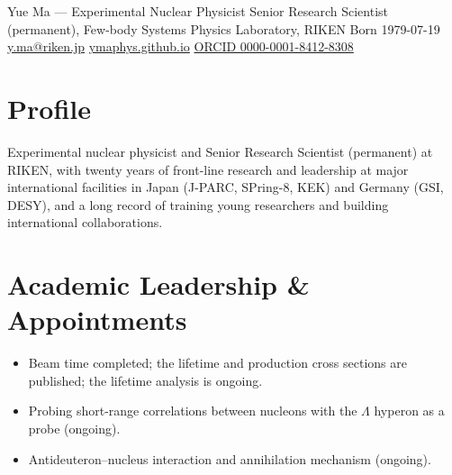 \documentclass[a4paper,11pt,fontset=none]{ctexart}
\begin{document}
  {Yue Ma --- Experimental Nuclear Physicist}
  {Senior Research Scientist (permanent), Few-body Systems Physics Laboratory, RIKEN \quad\textbar\quad Born 1979-07-19 \quad\textbar\quad \href{mailto:y.ma@riken.jp}{y.ma@riken.jp} \quad\textbar\quad \href{https://ymaphys.github.io}{ymaphys.github.io} \quad\textbar\quad \href{https://orcid.org/0000-0001-8412-8308}{ORCID 0000-0001-8412-8308}}

\section{Profile}

Experimental nuclear physicist and Senior Research Scientist (permanent) at RIKEN, with twenty years of front-line research and leadership at major international facilities in Japan (J-PARC, SPring-8, KEK) and Germany (GSI, DESY), and a long record of training young researchers and building international collaborations. 

\section{Academic Leadership \& Appointments}
\begin{itemize}
  \item {} Beam time completed; the  lifetime and  production cross sections are published; the  lifetime analysis is ongoing.
  \item {} Probing short-range correlations between nucleons with the $\Lambda$ hyperon as a probe (ongoing).
  \item {} Antideuteron--nucleus interaction and annihilation mechanism (ongoing).
\end{itemize}
\end{document}
